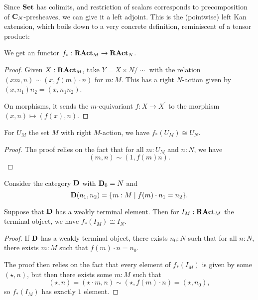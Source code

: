 Since $ \mathbf{Set} $ has colimits, and restriction of scalars corresponds to precomposition of $ \mathbf{C}_{N} $-presheaves, we can give it a left adjoint. This is the (pointwise) left Kan extension, which boils down to a very concrete definition, reminiscent of a tensor product:

\begin{lemma}\label{lem:scalar-extension}
  We get an  functor $ f_* : \mathbf{RAct}_{M} \to \mathbf{RAct}_{N} $.
\end{lemma}
\begin{proof}
  Given $ X : \mathbf{RAct}_{M} $, take $ Y = X \times N / \sim $ with the relation $ (x m, n) \sim (x, f(m) \cdot n) $ for $ m: M $. This has a right $ N $-action given by $ (x, n_1)n_2 = (x, n_1 n_2) $.

  On morphisms, it sends the $ m $-equivariant $ f: X \to X^\prime $ to the morphism $ (x, n) \mapsto (f(x), n) $.
\end{proof}

\begin{lemma}\label{lem:scalar-extension-monoid-monoid-action}
  For $ U_M $ the set $ M $ with right $ M $-action, we have $ f_*(U_M) \cong U_{N} $.
\end{lemma}
\begin{proof}
  The proof relies on the fact that for all $ m: U_M $ and $ n : N $, we have
  \[ (m, n) \sim (1, f(m) n). \]
\end{proof}

Consider the category $ \mathbf{D} $ with $ \mathbf{D}_0 = N $ and
\[ \mathbf{D}(n_1, n_2) = \{ m: M \mid f(m) \cdot n_1 = n_2 \}. \]

\begin{lemma}\label{lem:scalar-extension-terminal}
  Suppose that $ \mathbf{D} $ has a weakly terminal element. Then for $ I_M : \mathbf{RAct}_{M} $ the terminal object, we have $ f_*(I_M) \cong I_{N} $.
\end{lemma}
\begin{proof}
  If $ \mathbf{D} $ has a weakly terminal object, there exists $ n_0 : N $ such that for all $ n: N $, there exists $ m: M $ such that $ f(m) \cdot n = n_0 $.

  The proof then relies on the fact that every element of $ f_*(I_M) $ is given by some $ (\star, n) $, but then there exists some $ m : M $ such that
  \[ (\star, n) = (\star \cdot m, n) \sim (\star, f(m) \cdot n) = (\star, n_0), \]
  so $ f_*(I_M) $ has exactly $ 1 $ element.
\end{proof}

